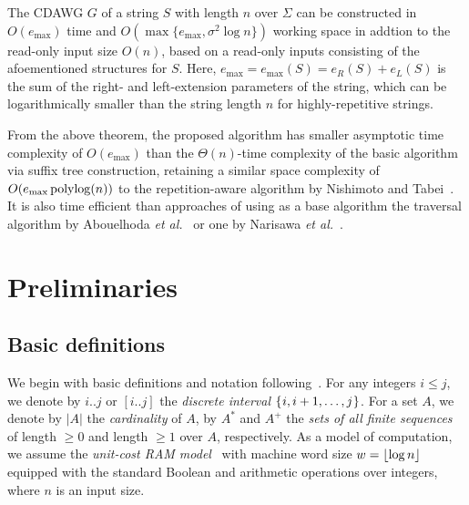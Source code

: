 \documentclass{article}
\begin{document}
\begin{theorem}\label{thm:main:cdawg:sa:lcp}
  The CDAWG $G$ of a string $S$ with length $n$ over $\Sigma$ can be constructed in $O(e_{\max})$ time and $O(\max\{e_{\max}, \sigma^2\log n\})$ working space in addtion to the read-only input size $O(n)$, based on a read-only inputs consisting of the afoementioned structures for $S$.  
Here, $e_{\max} = e_{\max}(S) = e_R(S) + e_L(S)$ is the sum of the right- and left-extension parameters of the string, which can be logarithmically smaller than the string length $n$ for highly-repetitive strings.\end{theorem}

From the above theorem, the proposed algorithm has smaller asymptotic time complexity of $O(e_{\max})$ than the $\Theta(n)$-time complexity of the basic algorithm via suffix tree construction, retaining a similar space complexity of $O(e_{\max}\,\mathrm{polylog}(n))$ to the repetition-aware algorithm by Nishimoto and Tabei~\cite{nishimoto:cpm2021enum}.
It is also time efficient than approaches of using as a base algorithm the traversal algorithm by Abouelhoda \textit{et al.}~\cite{abouelhoda2004replacing} or one by Narisawa \textit{et al.}~\cite{narisawa2007efficient}. 



\section{Preliminaries}
\label{sec:prelim}

\subsection{Basic definitions}
We begin with basic definitions and notation following~\cite{charalampopoulos2018extended,barton2014linear,ilie2011minimum,belazzougui2015space:unusual}.
For any integers $i\le j$, we denote by $i..j$ or $[i..j]$ the \textit{discrete interval} $\{\kern0.05emi, i+1, \dots, j\kern0.05em\}$. For a set $A$, we denote by $|A|$ the \textit{cardinality} of $A$, by $A^*$ and $A^+$ the \textit{sets of all finite sequences} of length $\ge 0$ and length $\ge 1$ over $A$, respectively.
As a model of computation, we assume the \textit{unit-cost RAM model}~\cite{cormen2009introduction} with machine word size $w = \lfloor \log n\rfloor$ equipped with the standard Boolean and arithmetic operations over integers, where $n$ is an input size.
\end{document}
